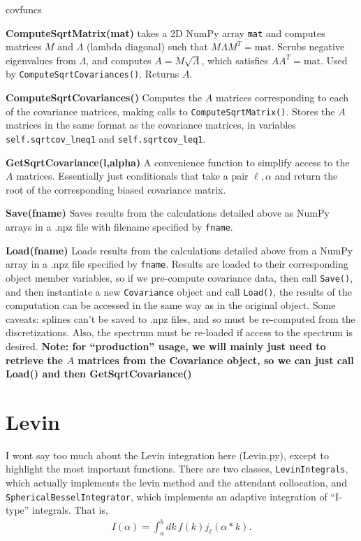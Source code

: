 \documentclass[10pt,a4paper]{article}
\begin{document}
\begin{labeling}{covfuncs}
	\item[\textbf{ComputeSqrtMatrix(mat)}] takes a 2D NumPy array \verb|mat| and computes matrices $M$ and $\Lambda$ (lambda diagonal) such that $M\Lambda M^T = \text{mat}$. Scrubs negative eigenvalues from $\Lambda$, and computes $A = M\sqrt{\Lambda}$, which satisfies $AA^T = \text{mat}$. Used by \verb|ComputeSqrtCovariances()|. Returns $A$.
	
	\item[\textbf{ComputeSqrtCovariances()}] Computes the $A$ matrices corresponding to each of the covariance matrices, making calls to \verb|ComputeSqrtMatrix()|. Stores the $A$ matrices in the same format as the covariance matrices, in variables \verb|self.sqrtcov_lneq1| and \verb|self.sqrtcov_leq1|.
	
	\item[\textbf{GetSqrtCovariance(l,alpha)}] A convenience function to simplify access to the $A$ matrices. Essentially just conditionals that take a pair $\ell,\alpha$ and return the root of the corresponding biased covariance matrix.
	
	\item[\textbf{Save(fname)}] Saves results from the calculations detailed above as NumPy arrays in a .npz file with filename specified by \verb|fname|.
	
	\item[\textbf{Load(fname)}] Loads results from the calculations detailed above from a NumPy array in a .npz file specified by \verb|fname|. Results are loaded to their corresponding object member variables, so if we pre-compute covariance data, then call \verb|Save()|, and then instantiate a new \verb|Covariance| object and call \verb|Load()|, the results of the computation can be accessed in the same way as in the original object. Some caveats: splines can't be saved to .npz files, and so must be re-computed from the discretizations. Also, the spectrum must be re-loaded if access to the spectrum is desired.
	\textbf{Note: for ``production'' usage, we will mainly just need to retrieve the $A$ matrices from the Covariance object, so we can just call Load() and then GetSqrtCovariance()}
\end{labeling}

\section{Levin}
I wont say too much about the Levin integration here (Levin.py), except to highlight the most important functions. There are two classes, \verb|LevinIntegrals|, which actually implements the levin method and the attendant collocation, and \verb|SphericalBesselIntegrator|, which implements an adaptive integration of ``I-type'' integrals. That is,
\begin{align} \label{eq:iint}
	I(\alpha) = \int_{a}^{b}dk\, f(k)j_\ell(\alpha*k).
\end{align}
\end{document}
